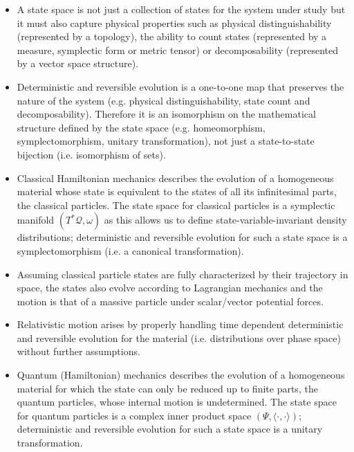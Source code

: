 \documentclass[smallextended]{svjour3}
\numberwithin{equation}{section}
\theoremstyle{definition}
\begin{document}
\begin{itemize}

\item A state space is not just a collection of states for the system under study but it must also capture physical properties such as physical distinguishability (represented by a topology), the ability to count states (represented by a measure, symplectic form or metric tensor) or decomposability (represented by a vector space structure).

\item Deterministic and reversible evolution is a one-to-one map that preserves the nature of the system (e.g. physical distinguishability, state count and decomposability). Therefore it is an isomorphism on the mathematical structure defined by the state space (e.g. homeomorphism, symplectomorphism, unitary transformation), not just a state-to-state bijection (i.e. isomorphism of sets).

\item Classical Hamiltonian mechanics describes the evolution of a homogeneous material whose state is equivalent to the states of all its infinitesimal parts, the classical particles. The state space for classical particles is a symplectic manifold $(T^*\mathcal{Q}, \omega)$ as this allows us to define state-variable-invariant density distributions; deterministic and reversible evolution for such a state space is a symplectomorphism (i.e. a canonical transformation).

\item Assuming classical particle states are fully characterized by their trajectory in space, the states also evolve according to Lagrangian mechanics and the motion is that of a massive particle under scalar/vector potential forces.

\item Relativistic motion arises by properly handling time dependent deterministic and reversible evolution for the material (i.e. distributions over phase space) without further assumptions.

\item Quantum (Hamiltonian) mechanics describes the evolution of a homogeneous material for which the state can only be reduced up to finite parts, the quantum particles, whose internal motion is undetermined. The state space for quantum particles is a complex inner product space $(\Psi, \langle \cdot , \cdot \rangle)$; deterministic and reversible evolution for such a state space is a unitary transformation.
\end{itemize}
\end{document}
